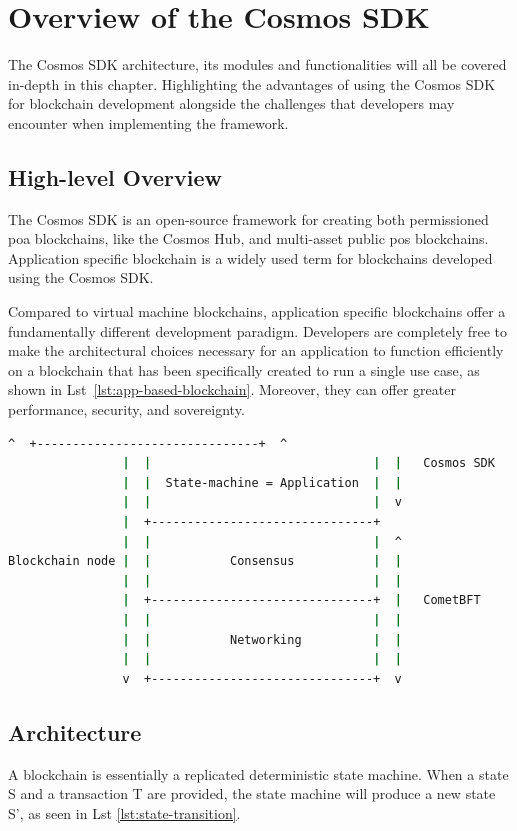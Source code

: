 \chapter{Overview of the Cosmos SDK}
\label{OCS:overview}
The Cosmos SDK architecture, its modules and functionalities will all be covered in-depth in this chapter. Highlighting the advantages of using the Cosmos SDK for blockchain development alongside the challenges that developers may encounter when implementing the framework.

\section{High-level Overview}
The Cosmos SDK is an open-source framework for creating both permissioned \gls{poa} blockchains, like the Cosmos Hub\cite{cosmos-hub}, and multi-asset public \gls{pos} blockchains. Application specific blockchain is a widely used term for blockchains developed using the Cosmos SDK.

Compared to virtual machine blockchains, application specific blockchains offer a fundamentally different development paradigm. Developers are completely free to make the architectural choices necessary for an application to function efficiently on a blockchain that has been specifically created to run a single use case, as shown in Lst~\ref{lst:app-based-blockchain}. Moreover, they can offer greater performance, security, and sovereignty.

\newpage
\begin{lstlisting}[language=bash, caption=Application based blockchains. Source:\cite{app-based-blockchain},label={lst:app-based-blockchain}]
                ^  +-------------------------------+  ^
                |  |                               |  |   Cosmos SDK
                |  |  State-machine = Application  |  |
                |  |                               |  v
                |  +-------------------------------+
                |  |                               |  ^
Blockchain node |  |           Consensus           |  |
                |  |                               |  |
                |  +-------------------------------+  |   CometBFT
                |  |                               |  |
                |  |           Networking          |  |
                |  |                               |  |
                v  +-------------------------------+  v
\end{lstlisting}

\section{Architecture}
A blockchain is essentially a replicated deterministic state machine. When a state S and a transaction T are provided, the state machine will produce a new state S', as seen in Lst \ref{lst:state-transition}.


